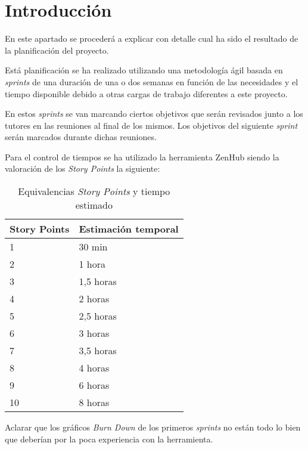 
\section{Introducción}

En este apartado se procederá a explicar con detalle cual ha sido el resultado de la planificación del proyecto.

Está planificación se ha realizado utilizando  una metodología ágil basada en \emph{sprints} de una duración de una o dos semanas en función de las necesidades y el tiempo disponible debido a otras cargas de trabajo diferentes a este proyecto.

En estos \emph{sprints} se van marcando ciertos objetivos que serán revisados junto a los tutores en las reuniones al final de los mismos. Los objetivos del siguiente \emph{sprint} serán marcados durante dichas reuniones.
 
Para el control de tiempos se ha utilizado la herramienta ZenHub siendo la valoración de los \emph{Story Points} la siguiente:


\begin{table}[htp]
\begin{center}
\begin{tabular}{ll}
\toprule
Story Points & Estimación temporal \\ \midrule
1            & 30 min              \\ \hline
2            & 1 hora              \\ \hline
3            & 1,5 horas           \\ \hline
4            & 2 horas             \\ \hline
5            & 2,5 horas           \\ \hline
6            & 3 horas             \\ \hline
7            & 3,5 horas           \\ \hline
8            & 4 horas             \\ \hline
9            & 6 horas             \\ \hline
10           & 8 horas             \\ \bottomrule
\end{tabular}
\caption{Equivalencias \emph{Story Points} y tiempo estimado}
\label{tabla:StoryPoints/tiempo}
\end{center}
\end{table}

Aclarar que los gráficos \emph{Burn Down} de los primeros \emph{sprints} no están todo lo bien que deberían por la poca experiencia con la herramienta.

